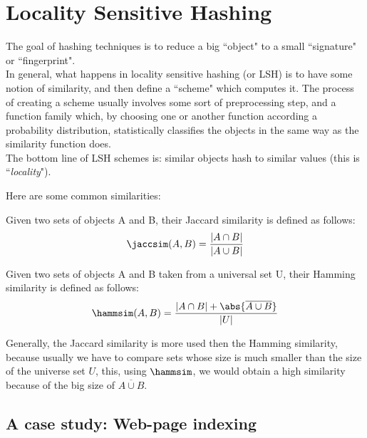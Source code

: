 
\chapter{Locality Sensitive Hashing}
	
	The goal of hashing techniques is to reduce a big ``object" to a small ``signature" or ``fingerprint".\\
	In general, what happens in locality sensitive hashing (or LSH) is to have some notion of similarity, and then define a ``scheme" which computes it. The process of creating a scheme usually involves some sort of preprocessing step, and a function family which, by choosing one or another function according a probability distribution, statistically classifies the objects in the same way as the similarity function does.\\
	The bottom line of LSH schemes is: similar objects hash to similar values (this is ``\textit{locality}").
	
	Here are some common similarities:
	
    \begin{defn}
        Given two sets of objects A and B, their Jaccard similarity is defined as follows:
        \begin{equation}
        \jaccsim(A, B) = \frac{|A\cap B|}{|A\cup B|}
        \end{equation}
    \end{defn}
	
    \begin{defn}
        Given two sets of objects A and B taken from a universal set U, their Hamming similarity is defined as follows:
        \begin{equation}
        \hammsim(A, B) = \frac{|A\cap B| + \abs{\overline{A\cup B}}}{|U|}
        \end{equation}
    \end{defn}

    \begin{obs}
        Generally, the Jaccard similarity is more used then the Hamming similarity, because usually we have to compare sets whose size is much smaller than the size of the universe set $U$, this, using $\hammsim$, we would obtain a high similarity because of the big size of $\overline{A\cup B}$.
    \end{obs}


\section{A case study: Web-page indexing}\label{sec:web-page-indexing}
	
